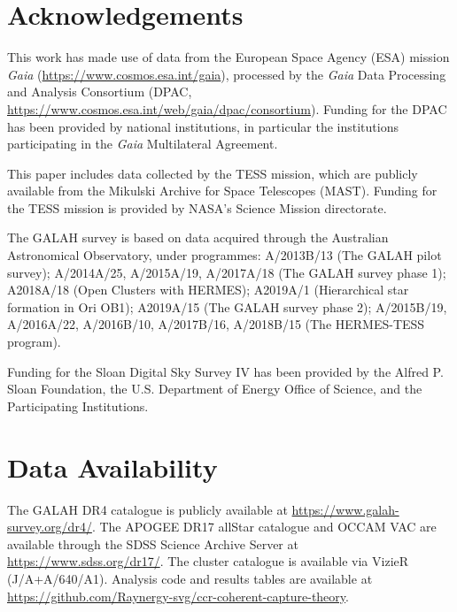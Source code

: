 \documentclass[fleqn,usenatbib]{mnras}
\begin{document}
\section*{Acknowledgements}

This work has made use of data from the European Space Agency (ESA) mission {\it Gaia} (\url{https://www.cosmos.esa.int/gaia}), processed by the {\it Gaia} Data Processing and Analysis Consortium (DPAC, \url{https://www.cosmos.esa.int/web/gaia/dpac/consortium}).
Funding for the DPAC has been provided by national institutions, in particular the institutions participating in the {\it Gaia} Multilateral Agreement.

This paper includes data collected by the TESS mission, which are publicly available from the Mikulski Archive for Space Telescopes (MAST).
Funding for the TESS mission is provided by NASA's Science Mission directorate.

The GALAH survey is based on data acquired through the Australian Astronomical Observatory, under programmes: A/2013B/13 (The GALAH pilot survey); A/2014A/25, A/2015A/19, A/2017A/18 (The GALAH survey phase 1); A2018A/18 (Open Clusters with HERMES); A2019A/1 (Hierarchical star formation in Ori OB1); A2019A/15 (The GALAH survey phase 2); A/2015B/19, A/2016A/22, A/2016B/10, A/2017B/16, A/2018B/15 (The HERMES-TESS program).

Funding for the Sloan Digital Sky Survey IV has been provided by the Alfred P. Sloan Foundation, the U.S. Department of Energy Office of Science, and the Participating Institutions.

\section*{Data Availability}

The GALAH DR4 catalogue is publicly available at \url{https://www.galah-survey.org/dr4/}.
The APOGEE DR17 allStar catalogue and OCCAM VAC are available through the SDSS Science Archive Server at \url{https://www.sdss.org/dr17/}.
The \citet{CantatGaudin2020} cluster catalogue is available via VizieR (J/A+A/640/A1).
Analysis code and results tables are available at \url{https://github.com/Raynergy-svg/ccr-coherent-capture-theory}.









\bsp	%
\label{lastpage}
\end{document}
